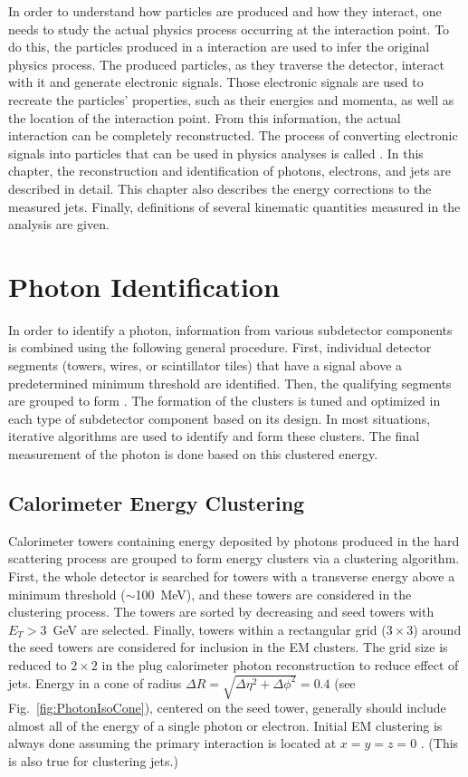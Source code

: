 \vspace{0.015\textheight}
In order to understand how particles are produced and how they interact, one needs to study the actual physics process occurring at the interaction point. To do this, the particles produced in a \ppbar interaction are used to infer the original physics process. The produced particles, as they traverse the detector, interact with it and generate electronic signals. Those electronic signals are used to recreate the particles' properties, such as their energies and momenta, as well as the location of the interaction point. From this information, the actual interaction can be completely reconstructed. The process of converting electronic signals into particles that can be used in physics analyses is called . In this chapter, the reconstruction and identification of photons, electrons, and jets are described in detail. This chapter also describes the energy corrections to the measured jets. Finally, definitions of several kinematic quantities measured in the analysis are given.

\section{Photon Identification}\label{sec:photon_identification}

In order to identify a photon, information from various subdetector components is combined using the following general procedure.  First, individual detector segments (towers, wires, or scintillator tiles) that have a signal above a predetermined minimum threshold are identified.  Then, the qualifying segments are grouped to form . The formation of the clusters is tuned and optimized in each type of subdetector component based on its design. In most situations, iterative algorithms are used to identify and form these clusters. The final measurement of the photon is done based on this clustered energy.

\subsection{Calorimeter Energy Clustering}
Calorimeter towers containing energy deposited by photons produced in the hard scattering process are grouped to form energy clusters via a clustering algorithm. First, the whole detector is searched for towers with a transverse energy above a minimum threshold ($\sim$100~MeV), and these towers are considered in the clustering process. The towers are sorted by decreasing \et and seed towers with $E_{T}>3$~GeV are selected. Finally, towers within a rectangular grid ($3\times 3$) around the seed towers are considered for inclusion in the EM clusters. The grid size is reduced to $2\times 2$ in the plug calorimeter photon reconstruction to reduce effect of jets. Energy in a cone of radius $\Delta R=\sqrt{\Delta\eta^{2}+\Delta\phi^{2}}=0.4$ (see Fig.~\ref{fig:PhotonIsoCone}), centered on the seed tower, generally should include almost all of the energy of a single photon or electron. Initial EM clustering is always done assuming the primary interaction is located at $x=y=z=0$ \cite{cdfnote:5456}. (This is also true for clustering jets.)

